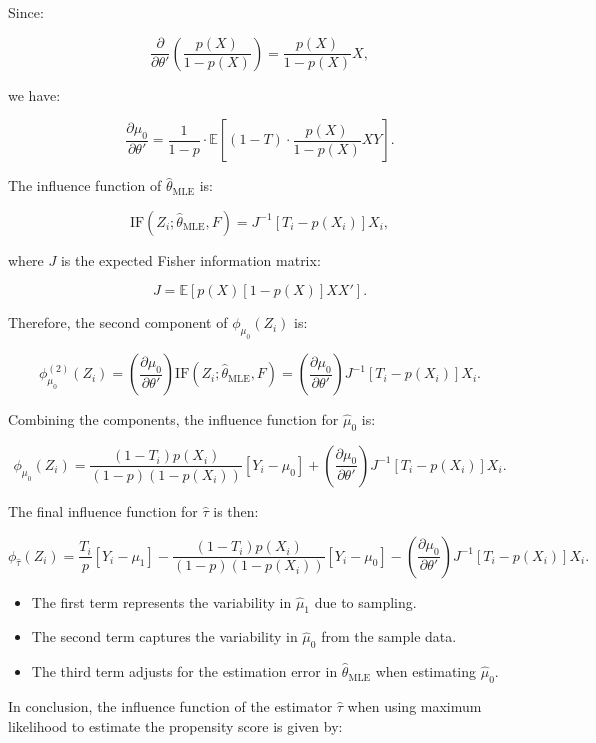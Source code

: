 \documentclass{article}
\begin{document}
\begin{itemize}
    Since:

    \[
    \frac{\partial}{\partial \theta'}\left( \frac{p(X)}{1 - p(X)} \right) = \frac{p(X)}{1 - p(X)} X,
    \]

    we have:

    \[
    \frac{\partial \mu_0}{\partial \theta'} = \frac{1}{1 - p} \cdot \mathbb{E}\left[ (1 - T) \cdot \frac{p(X)}{1 - p(X)} X Y \right].
    \]

    The influence function of \( \hat{\theta}_{\text{MLE}} \) is:

    \[
    \text{IF}(Z_i; \hat{\theta}_{\text{MLE}}, F) = J^{-1} [T_i - p(X_i)] X_i,
    \]

    where \( J \) is the expected Fisher information matrix:

    \[
    J = \mathbb{E}\left[ p(X) [1 - p(X)] X X' \right].
    \]

    Therefore, the second component of \( \phi_{\mu_0}(Z_i) \) is:

    \[
    \phi_{\mu_0}^{(2)}(Z_i) = \left( \frac{\partial \mu_0}{\partial \theta'} \right) \text{IF}(Z_i; \hat{\theta}_{\text{MLE}}, F) = \left( \frac{\partial \mu_0}{\partial \theta'} \right) J^{-1} [T_i - p(X_i)] X_i.
    \]
\end{itemize}

Combining the components, the influence function for \( \hat{\mu}_0 \) is:

\[
\phi_{\mu_0}(Z_i) = \frac{(1 - T_i) p(X_i)}{(1 - p)(1 - p(X_i))} [Y_i - \mu_0] + \left( \frac{\partial \mu_0}{\partial \theta'} \right) J^{-1} [T_i - p(X_i)] X_i.
\]

The final influence function for \( \hat{\tau} \) is then:

\[
\phi_{\hat{\tau}}(Z_i) = \frac{T_i}{p} [Y_i - \mu_1] - \frac{(1 - T_i) p(X_i)}{(1 - p)(1 - p(X_i))} [Y_i - \mu_0] - \left( \frac{\partial \mu_0}{\partial \theta'} \right) J^{-1} [T_i - p(X_i)] X_i.
\]

\begin{itemize}
    \item The first term represents the variability in \( \hat{\mu}_1 \) due to sampling.
    \item The second term captures the variability in \( \hat{\mu}_0 \) from the sample data.
    \item The third term adjusts for the estimation error in \( \hat{\theta}_{\text{MLE}} \) when estimating \( \hat{\mu}_0 \).
\end{itemize}

In conclusion, the influence function of the estimator \( \hat{\tau} \) when using maximum likelihood to estimate the propensity score is given by:
\end{document}
